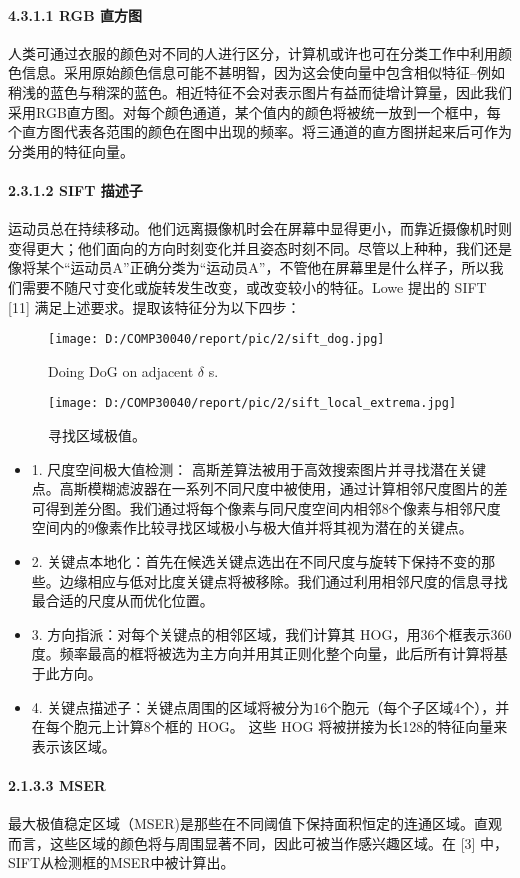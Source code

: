 \documentclass{article}
\begin{document}
\paragraph{4.3.1.1 RGB 直方图}
人类可通过衣服的颜色对不同的人进行区分，计算机或许也可在分类工作中利用颜色信息。采用原始颜色信息可能不甚明智，因为这会使向量中包含相似特征--例如稍浅的蓝色与稍深的蓝色。相近特征不会对表示图片有益而徒增计算量，因此我们采用RGB直方图。对每个颜色通道，某个值内的颜色将被统一放到一个框中，每个直方图代表各范围的颜色在图中出现的频率。将三通道的直方图拼起来后可作为分类用的特征向量。
\paragraph{2.3.1.2 SIFT 描述子}
运动员总在持续移动。他们远离摄像机时会在屏幕中显得更小，而靠近摄像机时则变得更大；他们面向的方向时刻变化并且姿态时刻不同。尽管以上种种，我们还是像将某个“运动员A”正确分类为“运动员A”，不管他在屏幕里是什么样子，所以我们需要不随尺寸变化或旋转发生改变，或改变较小的特征。Lowe 提出的 SIFT [11] 满足上述要求。提取该特征分为以下四步：
\begin{figure}
  \centering
  \texttt{[image: D:/COMP30040/report/pic/2/sift\_dog.jpg]} 
  \caption{Doing DoG on adjacent $\delta$ s.}
\end{figure}
\begin{figure}
  \centering
  \texttt{[image: D:/COMP30040/report/pic/2/sift\_local\_extrema.jpg]} 
  \caption{寻找区域极值。}
\end{figure}
\begin{itemize}
\item 1. 尺度空间极大值检测： 高斯差算法被用于高效搜索图片并寻找潜在关键点。高斯模糊滤波器在一系列不同尺度中被使用，通过计算相邻尺度图片的差可得到差分图。我们通过将每个像素与同尺度空间内相邻8个像素与相邻尺度空间内的9像素作比较寻找区域极小与极大值并将其视为潜在的关键点。
\item 2. 关键点本地化：首先在候选关键点选出在不同尺度与旋转下保持不变的那些。边缘相应与低对比度关键点将被移除。我们通过利用相邻尺度的信息寻找最合适的尺度从而优化位置。
\item 3. 方向指派：对每个关键点的相邻区域，我们计算其 HOG，用36个框表示360度。频率最高的框将被选为主方向并用其正则化整个向量，此后所有计算将基于此方向。
\item 4. 关键点描述子：关键点周围的区域将被分为16个胞元（每个子区域4个），并在每个胞元上计算8个框的 HOG。 这些 HOG 将被拼接为长128的特征向量来表示该区域。
\end{itemize}
\paragraph{2.1.3.3 MSER}
最大极值稳定区域（MSER)是那些在不同阈值下保持面积恒定的连通区域。直观而言，这些区域的颜色将与周围显著不同，因此可被当作感兴趣区域。在 [3] 中，SIFT从检测框的MSER中被计算出。
\end{document}
